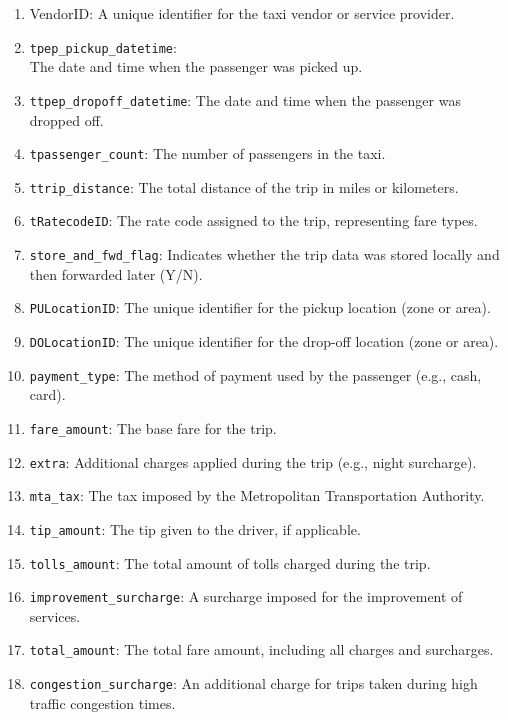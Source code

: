 \documentclass{article}
\begin{document}
\begin{enumerate}
    \item VendorID: A unique identifier for the taxi vendor or service provider.
    \item \verb|tpep_pickup_datetime|: \\ The date and time when the passenger was picked up.
    \item \verb|ttpep_dropoff_datetime|: The date and time when the passenger was dropped off.
    \item \verb|tpassenger_count|: The number of passengers in the taxi.
    \item \verb|ttrip_distance|: The total distance of the trip in miles or kilometers.
    \item \verb|tRatecodeID|: The rate code assigned to the trip, representing fare types.
    \item \verb|store_and_fwd_flag|: Indicates whether the trip data was stored locally and then forwarded later (Y/N).
    \item \verb|PULocationID|: The unique identifier for the pickup location (zone or area).
    \item \verb|DOLocationID|: The unique identifier for the drop-off location (zone or area). 
    \item \verb|payment_type|: The method of payment used by the passenger (e.g.,  cash, card).
    \item \verb|fare_amount|: The base fare for the trip.
    \item \verb|extra|: Additional charges applied during the trip (e.g., night surcharge).
    \item \verb|mta_tax|: The tax imposed by the Metropolitan Transportation Authority.
    \item \verb|tip_amount|: The tip given to the driver, if applicable.
    \item \verb|tolls_amount|: The total amount of tolls charged during the trip.
    \item \verb|improvement_surcharge|: A surcharge imposed for the improvement of services.
    \item \verb|total_amount|: The total fare amount, including all charges and surcharges.
    \item \verb|congestion_surcharge|: An additional charge for trips taken during high traffic congestion times.

\end{enumerate}
\end{document}
